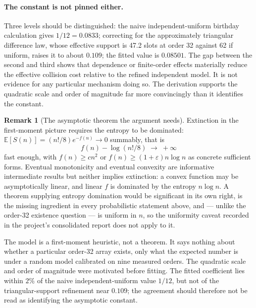 \documentclass[11pt,a4paper,oneside]{report}
\theoremstyle{definition}
\newtheorem{remark}[theorem]{Remark}
\begin{document}
\paragraph{The constant is not pinned either.} Three levels should be
distinguished: the naive independent-uniform birthday calculation gives
$1/12=0.0833$; correcting for the approximately triangular difference law, whose
effective support is 47.2 slots at order 32 against 62 if uniform, raises it to
about $0.109$; the fitted value is $0.08501$. The gap between the second and third
shows that dependence or finite-order effects materially reduce the effective
collision cost relative to the refined independent model. It is not evidence for
any particular mechanism doing so. The derivation supports the quadratic scale and
order of magnitude far more convincingly than it identifies the constant.

\begin{remark}[The asymptotic theorem the argument needs]
\label{p6-rem:openproblem}
Extinction in the first-moment picture requires the entropy to be dominated:
$\mathbb E[S(n)]=(n!/8)e^{-f(n)}\to0$ summably, that is
\[
f(n)-\log(n!/8)\;\longrightarrow\;+\infty
\]
fast enough, with $f(n)\ge cn^2$ or $f(n)\ge(1+\varepsilon)n\log n$ as concrete
sufficient forms. Eventual monotonicity and eventual convexity are informative
intermediate results but neither implies extinction: a convex function may be
asymptotically linear, and linear $f$ is dominated by the entropy $n\log n$. A
theorem supplying entropy domination would be significant in its own right, is
the missing ingredient in every probabilistic statement above, and --- unlike the
order-32 existence question --- is uniform in $n$, so the uniformity caveat recorded in the project's consolidated report does not apply to it.
\end{remark}

The model is a first-moment heuristic, not a theorem. It says nothing about
whether a particular order-32 array exists, only what the expected number is
under a random model calibrated on nine measured orders. The quadratic scale and order of magnitude were motivated before fitting. The
fitted coefficient lies within $2\%$ of the naive independent-uniform value
$1/12$, but not of the triangular-support refinement near $0.109$; the agreement
should therefore not be read as identifying the asymptotic constant.



\end{document}

